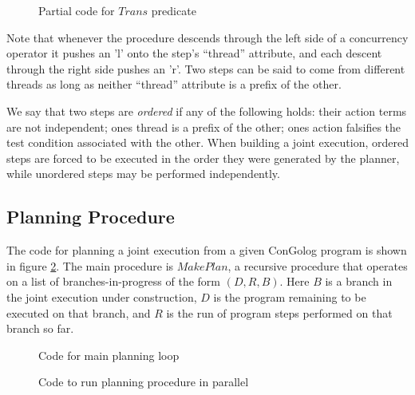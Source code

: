 %
\begin{figure}
%

\caption{
Partial code for $Trans$ predicate
}
\label{fig:trans-code}
\end{figure}


Note that whenever the procedure descends through the left side of
a concurrency operator it pushes an 'l' onto the step's {}``thread''
attribute, and each descent through the right side pushes an 'r'.
Two steps can be said to come from different threads as long as neither
{}``thread'' attribute is a prefix of the other.

We say that two steps are \emph{ordered} if any of the following holds:
their action terms are not independent; ones thread is a prefix of
the other; ones action falsifies the test condition associated with
the other. When building a joint execution, ordered steps are forced
to be executed in the order they were generated by the planner, while
unordered steps may be performed independently.




\subsection{Planning Procedure}

The code for planning a joint execution from a given ConGolog program
is shown in figure \ref{fig:planning-code}. The main procedure is
$MakePlan$, a recursive procedure that operates on a list of branches-in-progress
of the form $(D,R,B)$. Here $B$ is a branch in the joint execution
under construction, $D$ is the program remaining to be executed on
that branch, and $R$ is the run of program steps performed on that
branch so far.

%
\begin{figure}
%

\caption{
Code for main planning loop
}
\label{fig:planning-code}
\end{figure}


%
\begin{figure}
%

\caption{
Code to run planning procedure in parallel
}
\label{fig:parallel-search}
\end{figure}


